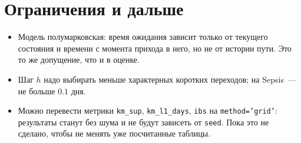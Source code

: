 \documentclass[11pt,a4paper]{article}
\newcommand{\code}[1]{\texttt{#1}}
\begin{document}
\section{Ограничения и дальше}

\begin{itemize}
\item Модель полумарковская: время ожидания зависит только от текущего состояния и времени
с момента прихода в него, но не от истории пути. Это то же допущение, что и в оценке.
\item Шаг $h$ надо выбирать меньше характерных коротких переходов; на Sepsis~--- не больше
$0.1$ дня.
\item Можно перевести метрики \code{km\_sup}, \code{km\_l1\_days}, \code{ibs} на
\code{method='grid'}: результаты станут без шума и не будут зависеть от \code{seed}.
Пока это не сделано, чтобы не менять уже посчитанные таблицы.
\end{itemize}
\end{document}
